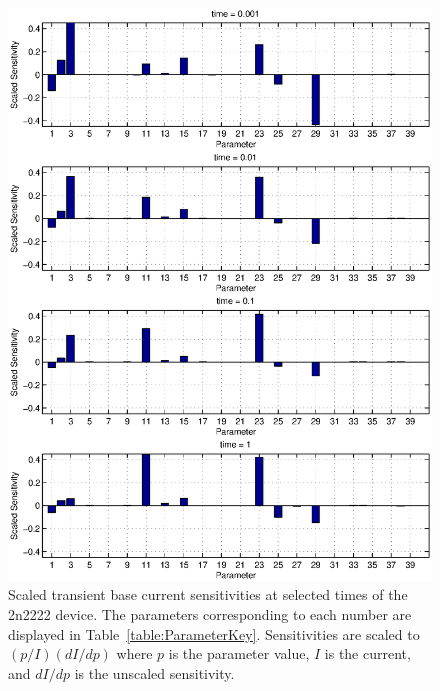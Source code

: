 \documentclass[pdf,ps2pdf,11pt]{SANDreport}
\begin{document}
{\bsinglespace
\begin{figure}[p]
\begin{center}
\includegraphics*[width=5in]{sensitivities_hist_report}
\end{center}
\caption[Scaled transient current sensitivities at selected times]{
\label{fig:SensitivitesHist}
Scaled transient base current sensitivities at selected times of the 
2n2222 device.
The parameters corresponding to each number are displayed in 
Table~\ref{table:ParameterKey}.  Sensitivities are scaled to $(p/I)(dI/dp)$ where
$p$ is the parameter value, $I$ is the current, and $dI/dp$ is the unscaled
sensitivity.}
\end{figure}
\esinglespace}
\end{document}
